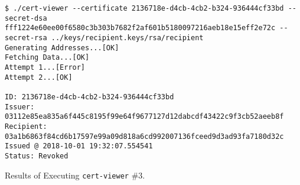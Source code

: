 \begin{listing}[ht]
	\begin{verbatim}
$ ./cert-viewer --certificate 2136718e-d4cb-4cb2-b324-936444cf33bd --secret-dsa fff1224e60ee00f6580c3b303b7682f2af601b5180097216aeb18e15eff2e72c --secret-rsa ../keys/recipient.keys/rsa/recipient
Generating Addresses...[OK]
Fetching Data...[OK]
Attempt 1...[Error]
Attempt 2...[OK]

ID: 2136718e-d4cb-4cb2-b324-936444cf33bd
Issuer: 03112e85ea835a6f445c8195f99e64f9677127d12dabcdf43422c9f3cb52aeeb8f
Recipient: 03a1b6863f84cd6b17597e99a09d818a6cd992007136fceed9d3ad93fa7180d32c
Issued @ 2018-10-01 19:32:07.554541
Status: Revoked

\end{verbatim}
	\caption{Results of Executing \texttt{cert-viewer} \#3.}
	\label{listing:view-revoke-results}
\end{listing}

